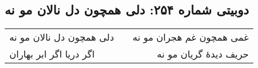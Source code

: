 \begin{center}
\section*{دوبیتی شماره ۲۵۴: دلی همچون دل نالان مو نه}
\label{sec:254}
\begin{longtable}{l p{0.5cm} r}
دلی همچون دل نالان مو نه
&&
غمی همچون غم هجران مو نه
\\
اگر دریا اگر ابر بهاران
&&
حریف دیدهٔ گریان مو نه
\\
\end{longtable}
\end{center}
